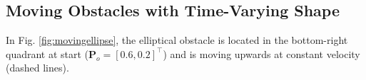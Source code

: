 \subsection{Moving Obstacles with Time-Varying Shape}

In Fig. \ref{fig:movingellipse}, the elliptical obstacle is located in the bottom-right quadrant at start ($\bm{P}_o = [0.6,0.2]^\top$) and is moving upwards at constant velocity (dashed lines).

